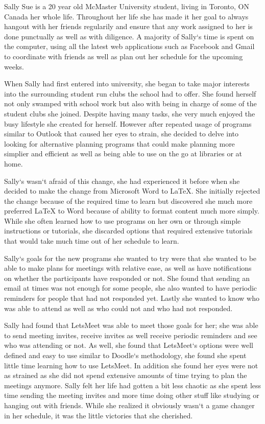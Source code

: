 \documentclass{sigchi}
\begin{document}
		Sally Sue is a 20 year old McMaster University student, living in Toronto, ON Canada her whole life. Throughout her life she has made it her goal to always hangout with her friends regularily and ensure that any work assigned to her is done punctually as well as with diligence. A majority of Sally`s time is spent on the computer, using all the latest web applications such as Facebook and Gmail to coordinate with friends as well as plan out her schedule for the upcoming weeks.

		When Sally had first entered into university, she began to take major interests into the surrounding student run clubs the school had to offer. She found herself not only swamped with school work but also with being in charge of some of the student clubs she joined. Despite having many tasks, she very much enjoyed the busy lifestyle she created for herself. However after repeated usage of programs similar to Outlook that caused her eyes to strain, she decided to delve into looking for alternative planning programs that could make planning more simplier and efficient as well as being able to use on the go at libraries or at home.

		Sally`s wasn`t afraid of this change, she had experienced it before when she decided to make the change from Microsoft Word to LaTeX. She initially rejected the change because of the required time to learn but discovered she much more preferred LaTeX to Word because of ability to format content much more simply. While she often learned how to use programs on her own or through simple instructions or tutorials, she discarded options that required extensive tutorials that would take much time out of her schedule to learn.

		Sally`s goals for the new programs she wanted to try were that she wanted to be able to make plans for meetings with relative ease, as well as have notifications on whether the participants have responded or not. She found that sending an email at times was not enough for some people, she also wanted to have periodic reminders for people that had not responded yet. Lastly she wanted to know who was able to attend as well as who could not and who had not responded.

		Sally had found that LetsMeet was able to meet those goals for her; she was able to send meeting invites, receive invites as well receive periodic reminders and see who was attending or not. As well, she found that LetsMeet`s options were well defined and easy to use similar to Doodle`s methodology, she found she spent little time learning how to use LetsMeet. In addition she found her eyes were not as strained as she did not spend extensive amounts of time trying to plan the meetings anymore. Sally felt her life had gotten a bit less chaotic as she spent less time sending the meeting invites and more time doing other stuff like studying or hanging out with friends. While she realized it obviously wasn`t a game changer in her schedule, it was the little victories that she cherished.
\end{document}
